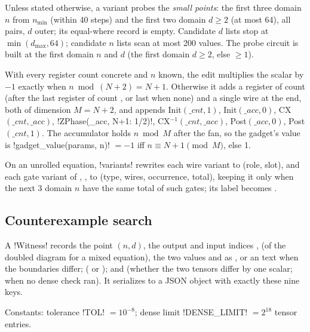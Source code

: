 Unless stated otherwise, a variant probes the \emph{small points}: the first three domain $n$
from $n_{\min}$ (within 40 steps) and the first two domain $d\ge2$ (at most 64), all pairs, $d$
outer; its equal-where record is empty. Candidate $d$ lists stop at $\min(d_{\max}, 64)$;
candidate $n$ lists scan at most 200 values. The probe circuit is built at the first domain $n$
and $d$ (the first domain $d\ge2$, else $\ge1$).

\begin{algorithm}\label{alg:bench-gadget}
With every register count concrete and $n$ known, the edit multiplies the scalar by $-1$ exactly
when $n \bmod (N+2) = N+1$. Otherwise it adds a register  of count  (after the
last register of count , or last when none) and a single wire  at the end, both
of dimension $M = N+2$, and appends Init$(\_cnt, 1)$, Init$(\_acc, 0)$, CX$(\_cnt, \_acc)$,
\py!ZPhase(_acc, {N+1: 1/2})!, CX$^{-1}(\_cnt,\_acc)$, Post$(\_acc,0)$, Post$(\_cnt,1)$. The
accumulator holds $n \bmod M$ after the fan, so the gadget's value is
\py!gadget_value(params, n)! $=-1$ iff $n\equiv N+1 \pmod M$, else 1.
\end{algorithm}

On an unrolled equation, \py!variants! rewrites each wire variant to (role, slot), and each
gate variant of , ,  to
(type, wires, occurrence, total), keeping it only when the next 3 domain $n$ have the same total
of such gates; its label becomes .

\subsection{Counterexample search}

\begin{definition}[Counterexample]
A \py!Witness! records the point $(n,d)$, the output and input indices , 
(of the doubled diagram for a mixed equation), the two values  and  as
, or an  text when the boundaries differ; 
( or ); and  (whether the two tensors differ by
one scalar;  when no dense check ran). It serializes to a JSON object with exactly
these nine keys.
\end{definition}

Constants: tolerance \py!TOL! $=10^{-8}$; dense limit \py!DENSE_LIMIT! $=2^{18}$ tensor entries.

